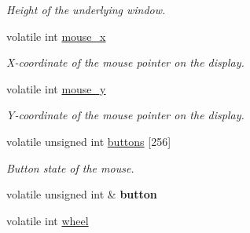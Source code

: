 \begin{DoxyCompactItemize}
\begin{DoxyCompactList}\small\item\em Height of the underlying window. \item\end{DoxyCompactList}\item 
\hypertarget{structcimg__library_1_1_c_img_display_a22c8a3db652fd12f487a7bc226da948c}{
volatile int \hyperlink{structcimg__library_1_1_c_img_display_a22c8a3db652fd12f487a7bc226da948c}{mouse\_\-x}}
\label{structcimg__library_1_1_c_img_display_a22c8a3db652fd12f487a7bc226da948c}

\begin{DoxyCompactList}\small\item\em X-\/coordinate of the mouse pointer on the display. \item\end{DoxyCompactList}\item 
\hypertarget{structcimg__library_1_1_c_img_display_afaa6caf08e8d0e42f3ca4103ffe77d9a}{
volatile int \hyperlink{structcimg__library_1_1_c_img_display_afaa6caf08e8d0e42f3ca4103ffe77d9a}{mouse\_\-y}}
\label{structcimg__library_1_1_c_img_display_afaa6caf08e8d0e42f3ca4103ffe77d9a}

\begin{DoxyCompactList}\small\item\em Y-\/coordinate of the mouse pointer on the display. \item\end{DoxyCompactList}\item 
\hypertarget{structcimg__library_1_1_c_img_display_a3011638314e3a34027c637584c25ccde}{
volatile unsigned int \hyperlink{structcimg__library_1_1_c_img_display_a3011638314e3a34027c637584c25ccde}{buttons} \mbox{[}256\mbox{]}}
\label{structcimg__library_1_1_c_img_display_a3011638314e3a34027c637584c25ccde}

\begin{DoxyCompactList}\small\item\em Button state of the mouse. \item\end{DoxyCompactList}\item 
\hypertarget{structcimg__library_1_1_c_img_display_aba09e48c5244aa402641a1799a80bef8}{
volatile unsigned int \& {\bfseries button}}
\label{structcimg__library_1_1_c_img_display_aba09e48c5244aa402641a1799a80bef8}

\item 
\hypertarget{structcimg__library_1_1_c_img_display_a8f9f97f8b6379c3c7dd75353ca3a432d}{
volatile int \hyperlink{structcimg__library_1_1_c_img_display_a8f9f97f8b6379c3c7dd75353ca3a432d}{wheel}}
\label{structcimg__library_1_1_c_img_display_a8f9f97f8b6379c3c7dd75353ca3a432d}


\end{DoxyCompactItemize}
